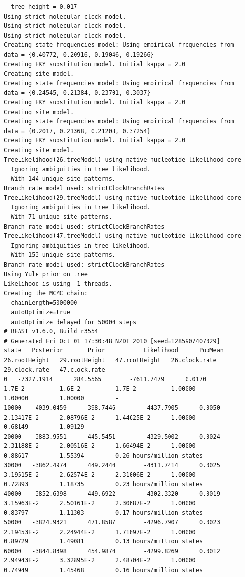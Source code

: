 \documentclass[12pt]{article}
\begin{document}
{\begin{verbatim}
  tree height = 0.017
Using strict molecular clock model.
Using strict molecular clock model.
Using strict molecular clock model.
Creating state frequencies model: Using empirical frequencies from data = {0.40772, 0.20916, 0.19046, 0.19266}
Creating HKY substitution model. Initial kappa = 2.0
Creating site model.
Creating state frequencies model: Using empirical frequencies from data = {0.24545, 0.21384, 0.23701, 0.3037}
Creating HKY substitution model. Initial kappa = 2.0
Creating site model.
Creating state frequencies model: Using empirical frequencies from data = {0.2017, 0.21368, 0.21208, 0.37254}
Creating HKY substitution model. Initial kappa = 2.0
Creating site model.
TreeLikelihood(26.treeModel) using native nucleotide likelihood core
  Ignoring ambiguities in tree likelihood.
  With 144 unique site patterns.
Branch rate model used: strictClockBranchRates
TreeLikelihood(29.treeModel) using native nucleotide likelihood core
  Ignoring ambiguities in tree likelihood.
  With 71 unique site patterns.
Branch rate model used: strictClockBranchRates
TreeLikelihood(47.treeModel) using native nucleotide likelihood core
  Ignoring ambiguities in tree likelihood.
  With 153 unique site patterns.
Branch rate model used: strictClockBranchRates
Using Yule prior on tree
Likelihood is using -1 threads.
Creating the MCMC chain:
  chainLength=5000000
  autoOptimize=true
  autoOptimize delayed for 50000 steps
# BEAST v1.6.0, Build r3554
# Generated Fri Oct 01 17:30:48 NZDT 2010 [seed=1285907407029]
state	Posterior   	Prior       	Likelihood  	PopMean     	26.rootHeight	29.rootHeight	47.rootHeight	26.clock.rate	29.clock.rate	47.clock.rate
0	-7327.1914  	284.5565    	-7611.7479  	0.0170      	1.7E-2      	1.6E-2      	1.7E-2      	1.00000     	1.00000     	1.00000     	-
10000	-4039.0459  	398.7446    	-4437.7905  	0.0050      	2.13417E-2  	2.08796E-2  	1.44625E-2  	1.00000     	0.68149     	1.09129     	-
20000	-3883.9551  	445.5451    	-4329.5002  	0.0024      	2.31188E-2  	2.00516E-2  	1.66494E-2  	1.00000     	0.88617     	1.55394     	0.26 hours/million states
30000	-3862.4974  	449.2440    	-4311.7414  	0.0025      	3.19515E-2  	2.62574E-2  	2.31006E-2  	1.00000     	0.72893     	1.18735     	0.23 hours/million states
40000	-3852.6398  	449.6922    	-4302.3320  	0.0019      	3.15963E-2  	2.50161E-2  	2.30687E-2  	1.00000     	0.83797     	1.11303     	0.17 hours/million states
50000	-3824.9321  	471.8587    	-4296.7907  	0.0023      	2.19453E-2  	2.24944E-2  	1.71097E-2  	1.00000     	0.89729     	1.49081     	0.13 hours/million states
60000	-3844.8398  	454.9870    	-4299.8269  	0.0012      	2.94943E-2  	3.32895E-2  	2.48704E-2  	1.00000     	0.74949     	1.45468     	0.16 hours/million states

\end{verbatim}}
\end{document}
